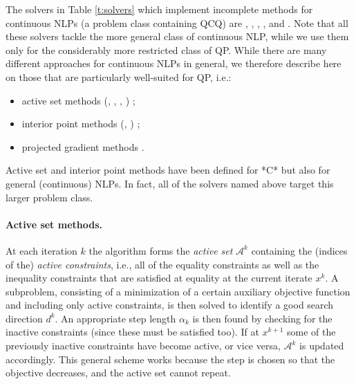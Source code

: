 The solvers in Table \ref{t:solvers} which implement incomplete methods for continuous NLPs (a problem class containing QCQ) are \conopt, \ipopt, \minos, \snopt, and \knitro. Note that all these solvers tackle the more general class of continuous NLP, while we use them only for the considerably more restricted class of QP. While there are many different approaches for continuous NLPs in general, we therefore describe here on those that are particularly well-suited for QP, i.e.:
%
\begin{itemize}
 \item active set methods (\conopt, \minos, \snopt, \knitro) \cite{Dost09};
 \item interior point methods (\ipopt, \knitro) \cite{Wright97};
 \item projected gradient methods \cite{CalaMore87:mp,ChenGui13:coap}.
\end{itemize}
%
Active set and interior point methods have been defined for *C* but also for general (continuous) NLPs. In fact, all of the solvers named above target this larger problem class.

\paragraph{Active set methods.}
%
At each iteration $k$ the algorithm forms the \emph{active set} $\mathcal{A}^k$ containing the (indices of the) \emph{active constraints}, i.e., all of the equality constraints as well as the inequality constraints that are satisfied at equality at the current iterate $x^k$. A subproblem, consisting of a minimization of a certain auxiliary objective function and including only active constraints, is then solved to identify a good search direction $d^k$. An appropriate step length $\alpha_k$ is then found by checking for the inactive constraints (since these must be satisfied too). If at $x^{k+1}$ some of the previously inactive constraints have become active, or vice versa, $\mathcal{A}^k$ is updated accordingly. This general scheme works because the step is chosen so that the objective decreases, and the active set cannot repeat. 

